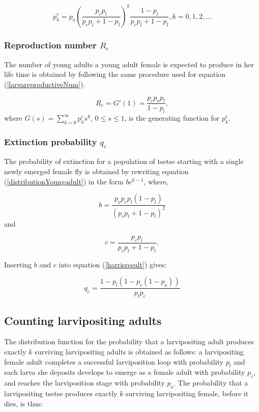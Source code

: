 \documentclass[smallextended]{svjour3}
\begin{document}
\begin{equation}
\label{distributionYoungadult}
p_{k}^{e} = p_{o}(\frac{p_{c}p_{l}}{p_{c}p_{l} + 1 - p_{l}} )^{k}\frac{1-p_{l}}{p_{c}p_{l} + 1 - p_{l}}, k =0,1,2,...
\end{equation}      

\subsubsection{Reproduction number $R_{e}$}

The number of young adults a young adult female is expected to produce in her life time is obtained by following the same procedure used for equation (\ref{larvareproductiveNum}).

\begin{equation}
\label{YoungAdulreproductiveNum}
R_{e} = G'(1) = \frac{p_{c}p_{o}p_{l}}{1-p_{l}},
\end{equation}  
where $G(s) = \sum_{k=0}^{\infty} p_{k}^{e}s^{k}  $, $0\leq s \leq 1$, is the generating function for $p_{k}^{e}$.

\subsubsection{Extinction probability  $q_{e}$}

The probability of extinction for a population of tsetse starting with a single newly emerged female fly is obtained by rewriting equation (\ref{distributionYoungadult}) in the form $bc^{k-1}$, where,

$$ b = \frac{p_{o}p_{c}p_{l}(1-p_{l})}{(p_{c}p_{l} + 1 - p_{l})^{2}} $$ and

$$ c = \frac{p_{c}p_{l}}{p_{c}p_{l} + 1 - p_{l}} , $$ 

Inserting $b$ and $c$ into equation (\ref{harrisresult}) gives:

\begin{equation}
\label{extinctionYoungadult}
q_{e} = \frac{1- p_{l}(1 -p_{c}(1- p_{o}))}{p_{l}p_{c}}
\end{equation}

\subsection{Counting larvipositing adults}

The distribution function for the probability that a larvipositing  adult produces exactly $k$ surviving larvipositing adults is obtained as follows: a larvipositing female adult completes  a successful  larviposition loop with probability $p_{l}$ and each larva she deposits develops to emerge as a female adult with probability $p_{c}$, and reaches the larviposition stage with probability $p_{o}$.  The probability that a larvipositing tsetse produces exactly $k$ surviving larvipositing female, before it dies, is thus:
\end{document}
